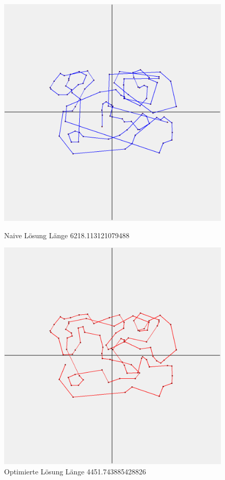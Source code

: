 \begin{figure}[!tbp]
    \centering
    \begin{minipage}[b]{0.4\textwidth}
        \includegraphics[width=\textwidth]{naivwenigerkrumm7}
        \caption{Naive Lösung Länge 6218.113121079488}
    \end{minipage}
    \hfill
    \begin{minipage}[b]{0.4\textwidth}
        \includegraphics[width=\textwidth]{optimizedwenigerkrumm7}
        \caption{Optimierte Lösung Länge 4451.743885428826}
    \end{minipage}\label{fig:wenigerkrumm7}
\end{figure}

